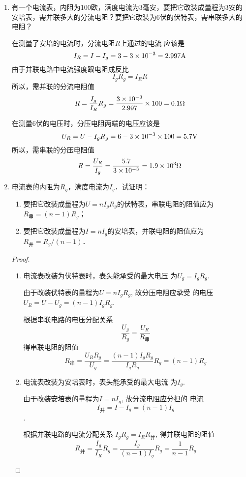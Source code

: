 \begin{enumerate}
    \item 有一个电流表，内阻为100欧，满度电流为3毫安，要把它改装成量程为3安的安培表，需并联多大的分流电阻？要把它改装为6伏的伏特表，需串联多大的电阻？

    \begin{solution}
在测量了安培的电流时，分流电阻$R$上通过的电流
应该是
\[I_R=I-I_g=3-3\times10^{-3}=2.997{\rm A}\]
由于并联电路中电流强度跟电阻成反比
\[I_gR_g=I_RR\]
所以，需并联的分流电阻值
\[R=\frac{I_g}{I_R}R_g=\frac{3\times10^{-3}}{2.997}\times100=0.1\Omega\]

在测量6伏的电压时，分压电阻两端的电压应该是
\[U_R=U-I_gR_g=6-3\times10^{-3}\times100=5.7{\rm V}\]
所以，需串联的分压电阻值
\[R=\frac{U_R}{I_g}=\frac{5.7}{3\times10^{-3}}=1.9\times10^3\Omega\]
    \end{solution}
    
    \item 电流表的内阻为$R_g$，满度电流为$I_g$．试证明：
     \begin{enumerate}
         \item 要把它改装成量程为$U=nI_gR_g$的伏特表，串联电阻的阻值应为$R_{\text{串}}=(n-1)R_g$；
         \item 要把它改装成量程为$I=nI_g$的安培表，并联电阻的阻值应为$R_{\text{并}}=R_g/(n-1)$．
     \end{enumerate}

     \begin{proof}
\begin{enumerate}
    \item 电流表改装为伏特表时，表头能承受的最大电压
    为$U_g=I_gR_g$.

    由于改装伏特表的量程为$U=nI_gR_g$, 故分压电阻应承受
    的电压$U_R=U-U_g=(n-1)I_gR_g$.

    根据串联电路的电压分配关系
    \[\frac{U_g}{R_g}=\frac{U_R}{R_{\text{串}}}\]
    得串联电阻的阻值
\[R_{\text{串}}=\frac{U_R R_g}{U_g}=\frac{(n-1)I_gR_g}{I_gR_g}R_g=(n-1)R_g\]

    \item 电流表改装为安培表时，表头能承受的最大电流
    为$I_g$.

    由于改装安培表的量程为$I=nI_g$, 故分流电阻应分担的
    电流 $$I_{\text{并}}=I-I_g=(n-1)I_g$$.

    根据并联电路的电流分配关系 $I_gR_g=I_R R_{\text{并}}$, 得并联电阻的阻值
\[R_{\text{并}}=\frac{I_g}{I_R}R_g=\frac{I_g}{(n-1)I_g}R_g=\frac{1}{n-1}R_g\]
\end{enumerate}
     \end{proof}
     

\end{enumerate}
